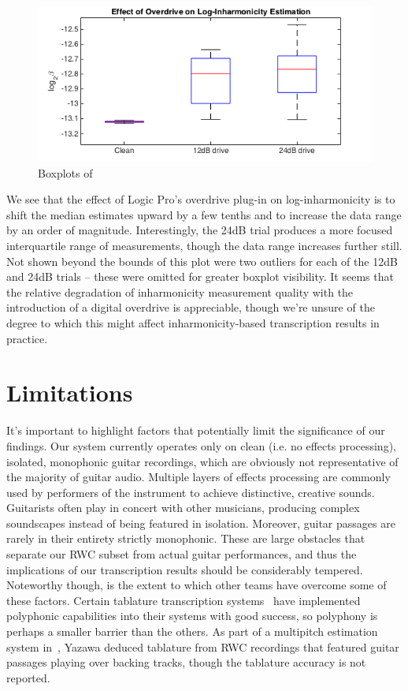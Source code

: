 \documentclass[12pt]{cmuthesis}
\begin{document}
\begin{figure}[!htbp] 
\centering
\includegraphics[scale=0.6]{eg-params-od}
\caption{Boxplots of }
\label{fig:eg-params-od}
\end{figure} 

We see that the effect of Logic Pro's overdrive plug-in on log-inharmonicity is to shift the median estimates upward by a few tenths and to increase the data range by an order of magnitude. Interestingly, the 24dB trial produces a more focused interquartile range of measurements, though the data range increases further still. Not shown beyond the bounds of this plot were two outliers for each of the 12dB and 24dB trials -- these were omitted for greater boxplot visibility. It seems that the relative degradation of inharmonicity measurement quality with the introduction of a digital overdrive is appreciable, though we're unsure of the degree to which this might affect inharmonicity-based transcription results in practice.

\section{Limitations}
It's important to highlight factors that potentially limit the significance of our findings. Our system currently operates only on clean (i.e. no effects processing), isolated, monophonic guitar recordings, which are obviously not representative of the majority of guitar audio. Multiple layers of effects processing are commonly used by performers of the instrument to achieve distinctive, creative sounds. Guitarists often play in concert with other musicians, producing complex soundscapes instead of being featured in isolation. Moreover, guitar passages are rarely in their entirety strictly monophonic. These are large obstacles that separate our RWC subset from actual guitar performances, and thus the implications of our transcription results should be considerably tempered. Noteworthy though, is the extent to which other teams have overcome some of these factors. Certain tablature transcription systems~\cite{barbanchoi2012,abesser2012,dittmar2013,kehling2014} have implemented polyphonic capabilities into their systems with good success, so polyphony is perhaps a smaller barrier than the others. As part of a multipitch estimation system in~\cite{yazawa2013}, Yazawa deduced tablature from RWC recordings that featured guitar passages playing over backing tracks, though the tablature accuracy is not reported.
\end{document}
